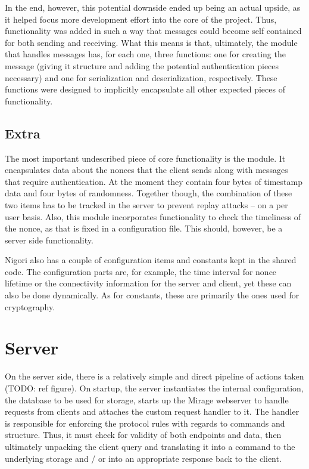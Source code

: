 In the end, however, this potential downside ended up being an actual upside, as it helped focus more development effort into the core of the project.
Thus, functionality was added in such a way that messages could become self contained for both sending and receiving.
What this means is that, ultimately, the module that handles messages has, for each one, three functions: one for creating the message (giving it structure and adding the potential authentication pieces necessary) and one for serialization and deserialization, respectively.
These functions were designed to implicitly encapsulate all other expected pieces of functionality.

\subsection{Extra}
The most important undescribed piece of core functionality is the  module.
It encapsulates data about the nonces that the client sends along with messages that require authentication.
At the moment they contain four bytes of timestamp data and four bytes of randomness.
Together though, the combination of these two items has to be tracked in the server to prevent replay attacks -- on a per user basis.
Also, this module incorporates functionality to check the timeliness of the nonce, as that is fixed in a configuration file.
This should, however, be a server side functionality.

Nigori also has a couple of configuration items and constants kept in the shared code.
The configuration parts are, for example, the time interval for nonce lifetime or the connectivity information for the server and client, yet these can also be done dynamically.
As for constants, these are primarily the ones used for cryptography.

\section{Server}
On the server side, there is a relatively simple and direct pipeline of actions taken (TODO: ref figure).
On startup, the server instantiates the internal configuration, the database to be used for storage, starts up the Mirage webserver to handle requests from clients and attaches the custom request handler to it.
The handler is responsible for enforcing the protocol rules with regards to commands and structure.
Thus, it must check for validity of both endpoints and data, then ultimately unpacking the client query and translating it into a command to the underlying storage and / or into an appropriate response back to the client.

